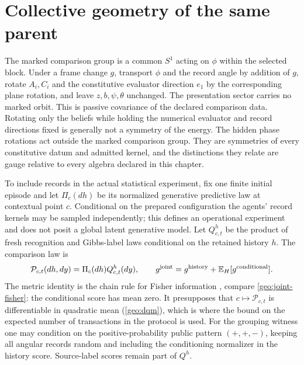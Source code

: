 \section{Collective geometry of the same parent}

The marked comparison group is a common $S^1$ acting on $\phi$ within the selected block. Under a frame change $g$, transport $\phi$ and the record angle by addition of $g$, rotate $A_i,C_i$ and the constitutive evaluator direction $e_1$ by the corresponding plane rotation, and leave $z,b,\psi,\theta$ unchanged. The presentation sector carries no marked orbit. This is passive covariance of the declared comparison data. Rotating only the beliefs while holding the numerical evaluator and record directions fixed is generally not a symmetry of the energy. The hidden phase rotations act outside the marked comparison group. They are symmetries of every constitutive datum and admitted kernel, and the distinctions they relate are gauge relative to every algebra declared in this chapter.

To include records in the actual statistical experiment, fix one finite initial episode and let $\Pi_c(dh)$ be its normalized generative predictive law at contextual point $c$. Conditional on the prepared configuration the agents' record kernels may be sampled independently; this defines an operational experiment and does not posit a global latent generative model. Let $Q_{c,t}^h$ be the product of fresh recognition and Gibbs-label laws conditional on the retained history $h$. The comparison law is
\begin{equation}
 \mathcal P_{c,t}(dh,dy)=\Pi_c(dh)Q_{c,t}^h(dy),\qquad
 g^{\rm joint}=g^{\rm history}+\mathbb E_H[g^{\rm conditional}].
 \label{pa:joint-record-geometry}
\end{equation}
The metric identity is the chain rule for Fisher information \citep{Zamir1998}, compare \cref{geo:joint-fisher}: the conditional score has mean zero. It presupposes that $c\mapsto\mathcal P_{c,t}$ is differentiable in quadratic mean (\cref{geo:dqm}), which is where the bound on the expected number of transactions in the protocol is used. For the grouping witness one may condition on the positive-probability public pattern $(+,+,-)$, keeping all angular records random and including the conditioning normalizer in the history score. Source-label scores remain part of $Q^h$.

